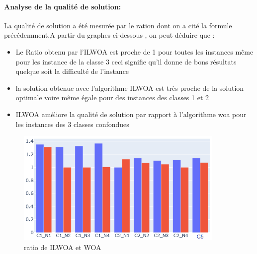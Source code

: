\documentclass[12pt]{article}
\begin{document}
 \paragraph{Analyse de la qualité de solution: }La qualité de solution a été mesurée par le ration dont on a cité la formule précédemment.A partir du graphes ci-dessous , on peut déduire que :
 \begin{itemize}
     \item Le Ratio obtenu par l’ILWOA est proche de 1 pour toutes les instances même pour les instance de la classe 3 ceci signifie qu’il donne de bons résultats quelque soit la difficulté de l’instance 
     \item la solution obtenue avec l’algorithme ILWOA est très proche de la solution optimale voire même égale pour des instances des classes 1 et 2 
     \item ILWOA améliore la qualité de solution par rapport à l’algorithme woa pour les instances des 3 classes confondues
 \end{itemize}
 \begin{figure}[h!]
     \centering
      \includegraphics[width=10cm]{../figures/ratio_ilwoa_woa}
      \caption[\small]{ratio de ILWOA et WOA}
  \end{figure}
\end{document}
